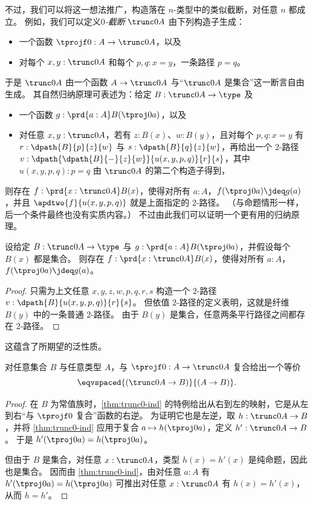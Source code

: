 %
%

%
不过，我们可以将这一想法推广，构造落在 $n$-类型中的类似截断，对任意 $n$ 都成立。
例如，我们可以定义\emph{$0$-截断} $\trunc0A$ 由下列构造子生成：
\begin{itemize}
\item 一个函数 $\tprojf0 : A \to \trunc0 A$，以及
\item 对每个 $x,y:\trunc0A$ 和每个 $p,q:x=y$，一条路径 $p=q$。
\end{itemize}
于是 $\trunc0A$ 由一个函数 $A\to \trunc0A$ 与“$\trunc0A$ 是集合”这一断言自由生成。
其自然归纳原理可表述为：给定 $B:\trunc0 A \to \type$ 及
\begin{itemize}
\item 一个函数 $g:\prd{a:A} B(\tproj0a)$，以及
\item 对任意 $x,y:\trunc0A$，若有 $z:B(x)$、$w:B(y)$，且对每个 $p,q:x=y$ 有 $r:\dpath{B}{p}{z}{w}$ 与 $s:\dpath{B}{q}{z}{w}$，再给出一个 $2$-路径 $v:\dpath{\dpath{B}{-}{z}{w}}{u(x,y,p,q)}{r}{s}$，其中 $u(x,y,p,q):p=q$ 由 $\trunc0A$ 的第二个构造子得到，
\end{itemize}
则存在 $f:\prd{x:\trunc0A} B(x)$，使得对所有 $a:A$，$f(\tproj0a)\jdeq g(a)$，并且 $\apdtwo{f}{u(x,y,p,q)}$ 就是上面指定的 $2$-路径。
（与命题情形一样，后一个条件最终也没有实质内容。）
不过由此我们可以证明一个更有用的归纳原理。

\begin{lem}\label{thm:trunc0-ind}
  设给定 $B:\trunc0 A \to \type$ 与 $g:\prd{a:A} B(\tproj0a)$，并假设每个 $B(x)$ 都是集合。
  则存在 $f:\prd{x:\trunc0A} B(x)$，使得对所有 $a:A$，$f(\tproj0a)\jdeq g(a)$。
\end{lem}
\begin{proof}
  只需为上文任意 $x,y,z,w,p,q,r,s$ 构造一个 $2$-路径 $v:\dpath{B}{u(x,y,p,q)}{r}{s}$。
  但依值 $2$-路径的定义表明，这就是纤维 $B(y)$ 中的一条普通 $2$-路径。
  由于 $B(y)$ 是集合，任意两条平行路径之间都存在 $2$-路径。
\end{proof}

这蕴含了所期望的泛性质。

\begin{lem}\label{thm:trunc0-lump}
  对任意集合 $B$ 与任意类型 $A$，与 $\tprojf0:A\to \trunc0A$ 复合给出一个等价
  \[ \eqvspaced{(\trunc0A\to B)}{(A\to B)}. \]
\end{lem}
\begin{proof}
  在 $B$ 为常值族时，\cref{thm:trunc0-ind} 的特例给出从右到左的映射，它是从左到右“与 $\tprojf0$ 复合”函数的右逆。
  为证明它也是左逆，取 $h:\trunc0A\to B$，并将 \cref{thm:trunc0-ind} 应用于复合 $a\mapsto h(\tproj0a)$，定义 $h':\trunc0A\to B$。
  于是 $h'(\tproj0a)=h(\tproj0a)$。

  但由于 $B$ 是集合，对任意 $x:\trunc0A$，类型 $h(x)=h'(x)$ 是纯命题，因此也是集合。
  因而由 \cref{thm:trunc0-ind}，由对任意 $a:A$ 有 $h'(\tproj0a)=h(\tproj0a)$ 可推出对任意 $x:\trunc0A$ 有 $h(x)=h'(x)$，从而 $h=h'$。
\end{proof}

